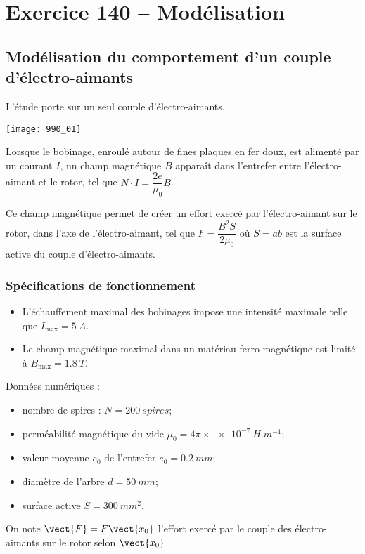 \section*{Exercice 140 -- Modélisation}
\setcounter{exo}{0}

\subsection*{Modélisation du comportement d’un couple d’électro-aimants}
L'étude porte sur un seul couple d'électro-aimants. 
\begin{center}
\texttt{[image: 990\_01]}
\end{center}

Lorsque le bobinage, enroulé autour de fines plaques en fer doux, est alimenté
par un courant $I$, un champ magnétique $B$ apparaît dans l'entrefer entre
l'électro-aimant et le rotor, tel que $N\cdot I =\dfrac{2e}{\mu_0 }B$.

Ce champ magnétique permet de créer un effort exercé par l'électro-aimant sur
le rotor, dans l'axe de l'électro-aimant, tel que $F=\dfrac{B^2 S}{2\mu_0}$ où $S=ab$ est la surface active du couple d'électro-aimants.


\subsubsection*{Spécifications de fonctionnement}
\begin{itemize}
\item L'échauffement maximal des bobinages impose une intensité maximale telle que $I_{\text{max}}=\SI{5}{A}$.
\item Le champ magnétique maximal dans un matériau ferro-magnétique est limité à $B_{\text{max}}=\SI{1,8}{T}$.
\end{itemize}

Données numériques :
\begin{itemize}
\item nombre de spires : $N=\SI{200}{spires}$;
\item perméabilité magnétique du vide $\mu_0 = 4\pi\times\SI{e-7}{H.m^{-1}}$;
\item valeur moyenne $e_0$ de l'entrefer $e_0=\SI{0,2}{mm}$;
\item diamètre de l'arbre $d=\SI{50}{mm}$;
\item surface active $S=\SI{300}{mm^2}$.
\end{itemize}


On note $\vect{F}=F\vect{x_0}$ l'effort exercé par le couple des électro-aimants sur le rotor
selon $\vect{x_0}$.

